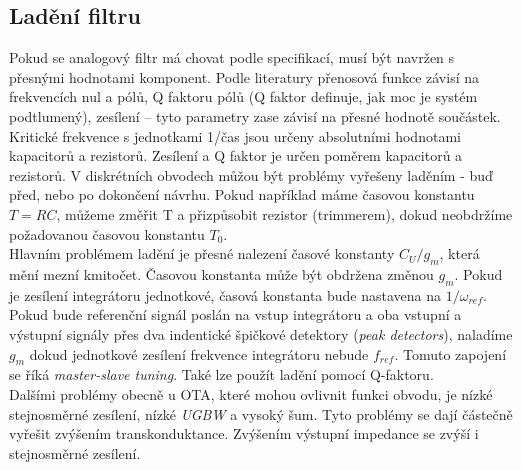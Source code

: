 \subsection{Ladění filtru}
\noindent Pokud se analogový filtr má chovat podle specifikací, musí být navržen s přesnými hodnotami komponent. Podle literatury \cite{18} přenosová funkce závisí na frekvencích nul a pólů, Q faktoru pólů (Q faktor definuje, jak moc je systém podtlumený), zesílení -- tyto parametry zase závisí na přesné hodnotě součástek. Kritické frekvence s jednotkami 1/čas jsou určeny absolutními hodnotami kapacitorů a rezistorů. Zesílení a Q faktor je určen poměrem kapacitorů a rezistorů. V diskrétních obvodech můžou být problémy vyřešeny laděním - buď před, nebo po dokončení návrhu. Pokud například máme časovou konstantu $T = RC$, můžeme změřit T a přizpůsobit rezistor (trimmerem), dokud neobdržíme požadovanou časovou konstantu $T_0$.\\
Hlavním problémem ladění je přesné nalezení časové konstanty $C_U/g_m$, která mění mezní kmitočet. Časovou konstanta může být obdržena změnou $g_m$. Pokud je zesílení integrátoru jednotkové, časová konstanta bude nastavena na $1/\omega _{ref}$. Pokud bude referenční signál poslán na vstup integrátoru a oba vstupní a výstupní signály přes dva indentické špičkové detektory (\textit{peak detectors}), naladíme $g_m$ dokud jednotkové zesílení frekvence integrátoru nebude $f_{ref}$. Tomuto zapojení se říká \textit{master-slave tuning}. Také lze použít ladění pomocí Q-faktoru. \\
Dalšími problémy obecně u OTA, které mohou ovlivnit funkci obvodu, je nízké stejnosměrné zesílení, nízké \textit{UGBW} a vysoký šum. Tyto problémy se dají částečně vyřešit zvýšením transkonduktance. Zvýšením výstupní impedance se zvýší i stejnosměrné zesílení.
